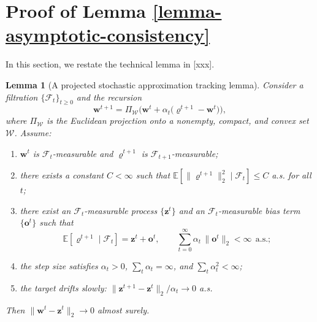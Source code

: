 \documentclass{IEEEtran}
\newtheorem{lemma}{Lemma}
\begin{document}
\section{Proof of Lemma \ref{lemma-asymptotic-consistency}}
\label{sec:proof-of-asymptotic-consistency}
In this section, we restate the technical lemma in [xxx]. 
\begin{lemma}[A projected stochastic approximation tracking lemma]
\label{lemma:appC_SA_tracking}
Consider a filtration $\{\mathcal{F}_t\}_{t\ge 0}$ and the recursion
\begin{equation}
\boldsymbol{w}^{t+1}=\Pi_{\mathcal{W}}\!\Big(\boldsymbol{w}^{t}+\alpha_t\big(\boldsymbol{\varrho}^{t+1}-\boldsymbol{w}^{t}\big)\Big),
\label{eq:appC_SA_recursion}
\end{equation}
where $\Pi_{\mathcal{W}}$ is the Euclidean projection onto a nonempty, compact, and convex set $\mathcal{W}$.
Assume:
\begin{enumerate}
\item $\boldsymbol{w}^{t}$ is $\mathcal{F}_t$-measurable and $\boldsymbol{\varrho}^{t+1}$ is $\mathcal{F}_{t+1}$-measurable;
\item there exists a constant $C<\infty$ such that $\mathbb{E}[\|\boldsymbol{\varrho}^{t+1}\|_2^2\mid\mathcal{F}_t]\le C$ a.s. for all $t$;
\item there exist an $\mathcal{F}_t$-measurable process $\{\boldsymbol{z}^t\}$ and an $\mathcal{F}_t$-measurable bias term $\{\boldsymbol{o}^t\}$ such that
\begin{equation}
\mathbb{E}[\boldsymbol{\varrho}^{t+1}\mid\mathcal{F}_t]=\boldsymbol{z}^t+\boldsymbol{o}^t,\qquad \sum_{t=0}^{\infty}\alpha_t\,\|\boldsymbol{o}^t\|_2<\infty\ \ \text{a.s.};
\label{eq:appC_cond_mean}
\end{equation}
\item the step size satisfies $\alpha_t>0$, $\sum_t\alpha_t=\infty$, and $\sum_t\alpha_t^2<\infty$;
\item the target drifts slowly: $\|\boldsymbol{z}^{t+1}-\boldsymbol{z}^t\|_2/\alpha_t\to 0$ a.s.
\end{enumerate}
Then $\|\boldsymbol{w}^{t}-\boldsymbol{z}^t\|_2\to 0$ almost surely.
\end{lemma}
\end{document}

